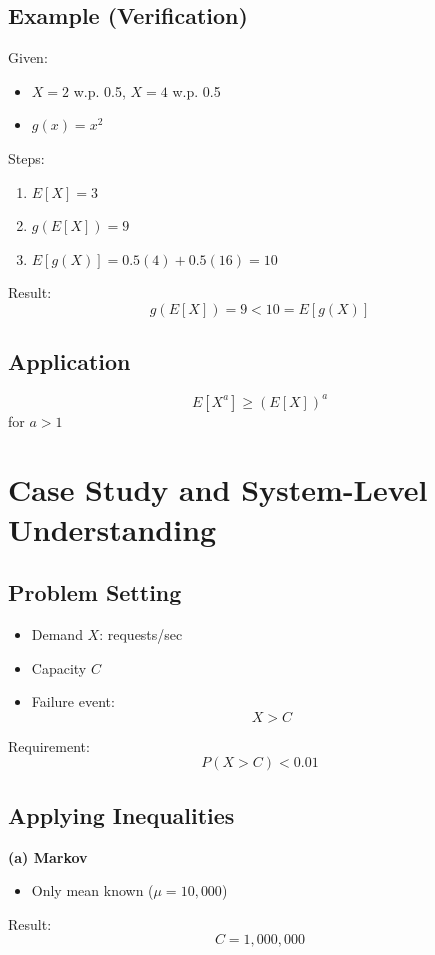 \documentclass[11pt]{article}
\begin{document}
\subsection{Example (Verification)}
Given:
\begin{itemize}
\item $X = 2$ w.p. 0.5, $X = 4$ w.p. 0.5
\item $g(x) = x^2$
\end{itemize}

Steps:
\begin{enumerate}
\item $E[X] = 3$
\item $g(E[X]) = 9$
\item $E[g(X)] = 0.5(4) + 0.5(16) = 10$
\end{enumerate}

Result:
\[
g(E[X]) = 9 < 10 = E[g(X)]
\]

\subsection{Application}
\[
E[X^a] \geq (E[X])^a
\]
for $a > 1$

\section{Case Study and System-Level Understanding}

\subsection{Problem Setting}
\begin{itemize}
\item Demand $X$: requests/sec
\item Capacity $C$
\item Failure event:
\[
X > C
\]
\end{itemize}

Requirement:
\[
P(X > C) < 0.01
\]

\subsection{Applying Inequalities}

\textbf{(a) Markov}
\begin{itemize}
\item Only mean known ($\mu = 10,000$)
\end{itemize}

Result:
\[
C = 1,000,000
\]
\end{document}

